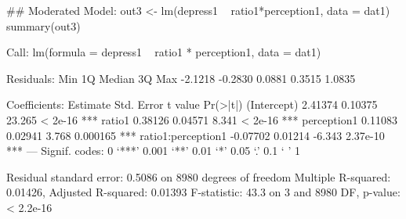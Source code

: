 \begin{Schunk}
\begin{Sinput}
 ## Moderated Model:
 out3 <- lm(depress1 ~ ratio1*perception1, data = dat1)
 summary(out3)
\end{Sinput}
\begin{Soutput}
Call:
lm(formula = depress1 ~ ratio1 * perception1, data = dat1)

Residuals:
    Min      1Q  Median      3Q     Max 
-2.1218 -0.2830  0.0881  0.3515  1.0835 

Coefficients:
                   Estimate Std. Error t value Pr(>|t|)    
(Intercept)         2.41374    0.10375  23.265  < 2e-16 ***
ratio1              0.38126    0.04571   8.341  < 2e-16 ***
perception1         0.11083    0.02941   3.768 0.000165 ***
ratio1:perception1 -0.07702    0.01214  -6.343 2.37e-10 ***
---
Signif. codes:  0 ‘***’ 0.001 ‘**’ 0.01 ‘*’ 0.05 ‘.’ 0.1 ‘ ’ 1

Residual standard error: 0.5086 on 8980 degrees of freedom
Multiple R-squared:  0.01426,	Adjusted R-squared:  0.01393 
F-statistic:  43.3 on 3 and 8980 DF,  p-value: < 2.2e-16
\end{Soutput}
\end{Schunk}
